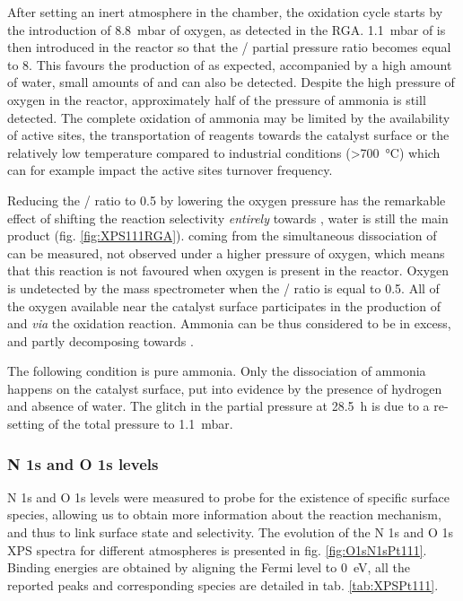 After setting an inert atmosphere in the chamber, the oxidation cycle starts by the introduction of \qty{8.8}{\milli\bar} of oxygen, as detected in the RGA.
\qty{1.1}{\milli\bar} of  is then introduced in the reactor so that the / partial pressure ratio becomes equal to \num{8}.
This favours the production of  as expected, accompanied by a high amount of water, small amounts of  and  can also be detected.
Despite the high pressure of oxygen in the reactor, approximately half of the pressure of ammonia is still detected.
The complete oxidation of ammonia may be limited by the availability of active sites, the transportation of reagents towards the catalyst surface or the relatively low temperature compared to industrial conditions (\qty{>700}{\degreeCelsius}) which can for example impact the active sites turnover frequency.

Reducing the / ratio to \num{0.5} by lowering the oxygen pressure has the remarkable effect of shifting the reaction selectivity \textit{entirely} towards , water is still the main product (fig. \ref{fig:XPS111RGA}).
 coming from the simultaneous dissociation of  can be measured, not observed under a higher pressure of oxygen, which means that this reaction is not favoured when oxygen is present in the reactor.
Oxygen is undetected by the mass spectrometer when the / ratio is equal to \num{0.5}.
All of the oxygen available near the catalyst surface participates in the production of  and  \textit{via} the oxidation reaction.
Ammonia can be thus considered to be in excess, and partly decomposing towards .

The following condition is pure ammonia.
Only the dissociation of ammonia happens on the catalyst surface, put into evidence by the presence of hydrogen and absence of water.
The glitch in the partial pressure at \qty{28.5}{\hour} is due to a re-setting of the total pressure to \qty{1.1}{\milli\bar}.

\subsubsection{N 1s and O 1s levels}

N 1s and O 1s levels were measured to probe for the existence of specific surface species, allowing us to obtain more information about the reaction mechanism, and thus to link surface state and selectivity.
The evolution of the N 1s and O 1s XPS spectra for different atmospheres is presented in fig. \ref{fig:O1sN1sPt111}.
Binding energies are obtained by aligning the Fermi level to \qty{0}{\eV}, all the reported peaks and corresponding species are detailed in tab. \ref{tab:XPSPt111}.

